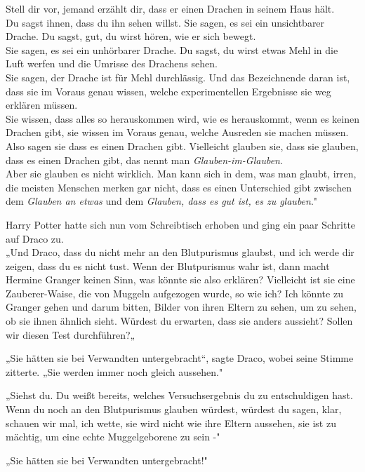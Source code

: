 {Stell dir vor, jemand erzählt dir, dass er einen Drachen in seinem Haus hält.\\ Du sagst ihnen, dass du ihn sehen willst. Sie sagen, es sei ein unsichtbarer Drache. Du sagst, gut, du wirst hören, wie er sich bewegt.\\ Sie sagen, es sei ein unhörbarer Drache. Du sagst, du wirst etwas Mehl in die Luft werfen und die Umrisse des Drachens sehen.\\ Sie sagen, der Drache ist für Mehl durchlässig. Und das Bezeichnende daran ist, dass sie im Voraus genau wissen, welche experimentellen Ergebnisse sie weg erklären müssen.\\ Sie wissen, dass alles so herauskommen wird, wie es herauskommt, wenn es keinen Drachen gibt, sie wissen im Voraus genau, welche Ausreden sie machen müssen.\\ Also sagen sie dass es einen Drachen gibt. Vielleicht glauben sie, dass sie glauben, dass es einen Drachen gibt, das nennt man \emph{Glauben-im-Glauben}.\\ Aber sie glauben es nicht wirklich. Man kann sich in dem, was man glaubt, irren, die meisten Menschen merken gar nicht, dass es einen Unterschied gibt zwischen dem \emph{Glauben an etwas} und dem \emph{Glauben, dass es gut ist, es zu glauben}."

Harry Potter hatte sich nun vom Schreibtisch erhoben und ging ein paar Schritte auf Draco zu.\\ „Und Draco, dass du nicht mehr an den Blutpurismus glaubst, und ich werde dir zeigen, dass du es nicht tust. Wenn der Blutpurismus wahr ist, dann macht Hermine Granger keinen Sinn, was könnte sie also erklären? Vielleicht ist sie eine Zauberer-Waise, die von Muggeln aufgezogen wurde, so wie ich? Ich könnte zu Granger gehen und darum bitten, Bilder von ihren Eltern zu sehen, um zu sehen, ob sie ihnen ähnlich sieht. Würdest du erwarten, dass sie anders aussieht? Sollen wir diesen Test durchführen?„

„Sie hätten sie bei Verwandten untergebracht“, sagte Draco, wobei seine Stimme zitterte. „Sie werden immer noch gleich aussehen."

„Siehst du. Du weißt bereits, welches Versuchsergebnis du zu entschuldigen hast.\\ Wenn du noch an den Blutpurismus glauben würdest, würdest du sagen, klar, schauen wir mal, ich wette, sie wird nicht wie ihre Eltern aussehen, sie ist zu mächtig, um eine echte Muggelgeborene zu sein -"

„Sie hätten sie bei Verwandten untergebracht!"

}
